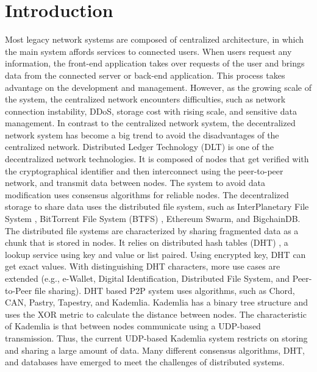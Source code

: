 \chapter{Introduction}
\label{cha:introduction}


Most legacy network systems are composed of centralized architecture, in which the main system affords services to connected users. When users request any information, the front-end application takes over requests of the user and brings data from the connected server or back-end application. This process takes advantage on the development and management. However, as the growing scale of the system, the centralized network encounters difficulties, such as network connection instability, DDoS, storage cost with rising scale, and sensitive data management. In contrast to the centralized network system, the decentralized network system has become a big trend to avoid the disadvantages of the centralized network. Distributed Ledger Technology (DLT) is one of the decentralized network technologies. It is composed of nodes that get verified with the cryptographical identifier and then interconnect using the peer-to-peer network, and transmit data between nodes. The system to avoid data modification uses consensus algorithms for reliable nodes. The decentralized storage to share data uses the distributed file system, such as InterPlanetary File System \cite{IPFS}\cite{benet2014ipfs}, BitTorrent File System (BTFS) \cite{BTFS}, Ethereum Swarm, and BigchainDB. The distributed file systems are characterized by sharing fragmented data as a chunk that is stored in nodes. It relies on distributed hash tables (DHT) \cite{sivaraja2008efficient}, a lookup service using key and value or list paired. Using encrypted key, DHT can get exact values. With distinguishing DHT characters, more use cases are extended (e.g., e-Wallet, Digital Identification, Distributed File System, and Peer-to-Peer file sharing). DHT based P2P system uses algorithms, such as Chord, CAN, Pastry, Tapestry, and Kademlia. Kademlia has a binary tree structure and uses the XOR metric to calculate the distance between nodes. The characteristic of Kademlia is that between nodes communicate using a UDP-based transmission. Thus, the current UDP-based Kademlia system restricts on storing and sharing a large amount of data. Many different consensus algorithms, DHT, and databases have emerged to meet the challenges of distributed systems.

